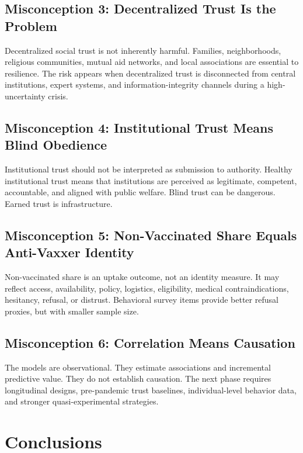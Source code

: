 \documentclass[12pt]{article}
\begin{document}
\subsection{Misconception 3: Decentralized Trust Is the Problem}

Decentralized social trust is not inherently harmful. Families, neighborhoods, religious communities, mutual aid networks, and local associations are essential to resilience. The risk appears when decentralized trust is disconnected from central institutions, expert systems, and information-integrity channels during a high-uncertainty crisis.

\subsection{Misconception 4: Institutional Trust Means Blind Obedience}

Institutional trust should not be interpreted as submission to authority. Healthy institutional trust means that institutions are perceived as legitimate, competent, accountable, and aligned with public welfare. Blind trust can be dangerous. Earned trust is infrastructure.

\subsection{Misconception 5: Non-Vaccinated Share Equals Anti-Vaxxer Identity}

Non-vaccinated share is an uptake outcome, not an identity measure. It may reflect access, availability, policy, logistics, eligibility, medical contraindications, hesitancy, refusal, or distrust. Behavioral survey items provide better refusal proxies, but with smaller sample size.

\subsection{Misconception 6: Correlation Means Causation}

The models are observational. They estimate associations and incremental predictive value. They do not establish causation. The next phase requires longitudinal designs, pre-pandemic trust baselines, individual-level behavior data, and stronger quasi-experimental strategies.

\section{Conclusions}
\end{document}
